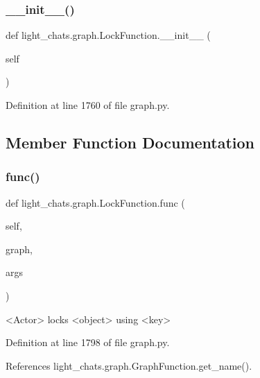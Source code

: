 \subsubsection{\texorpdfstring{\+\_\+\+\_\+init\+\_\+\+\_\+()}{\_\_init\_\_()}}
{\footnotesize\ttfamily def light\+\_\+chats.\+graph.\+Lock\+Function.\+\_\+\+\_\+init\+\_\+\+\_\+ (\begin{DoxyParamCaption}\item[{}]{self }\end{DoxyParamCaption})}



Definition at line 1760 of file graph.\+py.



\subsection{Member Function Documentation}
\mbox{\label{classlight__chats_1_1graph_1_1LockFunction_afdb92aaa380487d44d27381bd168240a}} 
\subsubsection{\texorpdfstring{func()}{func()}}
{\footnotesize\ttfamily def light\+\_\+chats.\+graph.\+Lock\+Function.\+func (\begin{DoxyParamCaption}\item[{}]{self,  }\item[{}]{graph,  }\item[{}]{args }\end{DoxyParamCaption})}

\begin{DoxyVerb}<Actor> locks <object> using <key>\end{DoxyVerb}
 

Definition at line 1798 of file graph.\+py.



References light\+\_\+chats.\+graph.\+Graph\+Function.\+get\+\_\+name().

